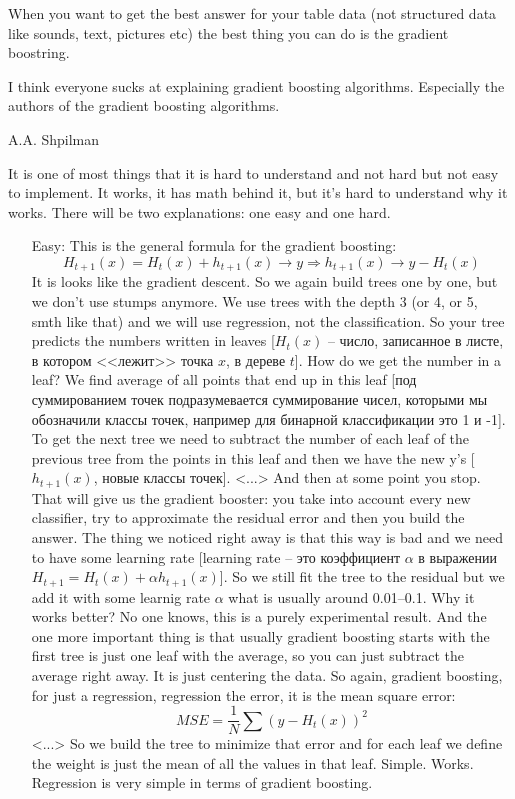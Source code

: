 When you want to get the best answer for your table data (not structured data like sounds, text, pictures etc) the best thing you can do is the gradient boostring.
\begin{displayquote}
  {\sf \glqq I think everyone sucks at explaining gradient boosting algorithms. Especially the authors of the gradient boosting algorithms.\grqq
  \begin{flushright}
    A.A. Shpilman
  \end{flushright}}
\end{displayquote}
It is one of most things that it is hard to understand and not hard but not easy to implement. It works, it has math behind it, but it's hard to understand why it works. There will be two explanations: one easy and one hard.
\begin{enumerate}
  \item[Easy:] This is the general formula for the gradient boosting:
  $$H_{t+1}(x)=H_t(x)+h_{t+1}(x)\to y \Rightarrow h_{t+1}(x)\to y - H_t(x)$$
  It is looks like the gradient descent. {\it <A little meeting with the gradient descent>} So we again build trees one by one, but we don't use stumps anymore. We use trees with the depth 3 (or 4, or 5, smth like that) and we will use regression, not the classification. So your tree predicts the numbers written in leaves [$H_t(x)$ -- число, записанное в листе, в котором <<лежит>> точка $x$, в дереве $t$]. How do we get the number in a leaf? We find average of all points that end up in this leaf [под суммированием точек подразумевается суммирование чисел, которыми мы обозначили классы точек, например для бинарной классификации это 1 и -1]. {\it <A slide with an example>} To get the next tree we need to subtract the number of each leaf of the previous tree from the points in this leaf and then we have the new y's [$h_{t+1}(x)$, новые классы точек]. <...> And then at some point you stop. That will give us the gradient booster: you take into account every new classifier, try to approximate the residual error and then you build the answer. The thing we noticed right away is that this way is bad and we need to have some learning rate [learning rate -- это коэффициент $\alpha$ в выражении $H_{t+1}=H_t(x)+\alpha h_{t+1}(x)$]. So we still fit the tree to the residual but we add it with some learnig rate $\alpha$ what is usually around 0.01--0.1. Why it works better? No one knows, this is a purely experimental result. {\it <Some intuition about this experimental result>} And the one more important thing is that usually gradient boosting starts with the first tree is just one leaf with the average, so you can just subtract the average right away. It is just centering the data. So again, gradient boosting, for just a regression, regression the error, it is the mean square error: $$MSE = \frac{1}{N}\sum(y-H_t(x))^2$$ <...> So we build the tree to minimize that error and for each leaf we define the weight is just the mean of all the values in that leaf. Simple. Works. Regression is very simple in terms of gradient boosting.\\

\end{enumerate}
